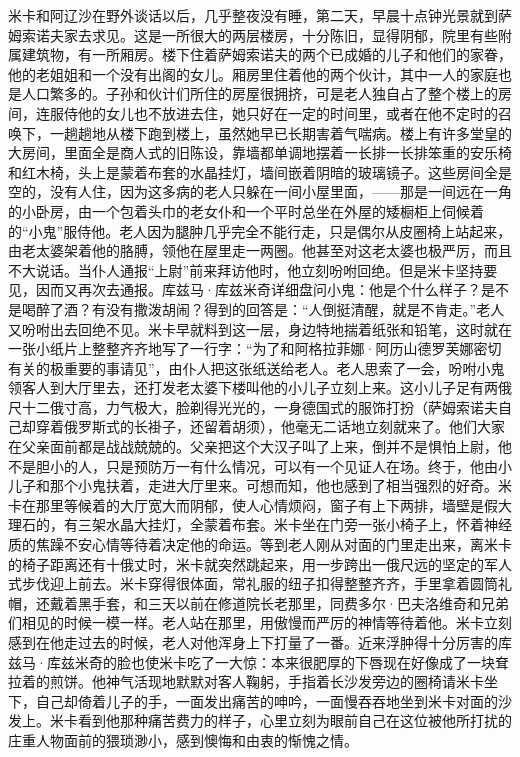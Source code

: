 \par 米卡和阿辽沙在野外谈话以后，几乎整夜没有睡，第二天，早晨十点钟光景就到萨姆索诺夫家去求见。这是一所很大的两层楼房，十分陈旧，显得阴郁，院里有些附属建筑物，有一所厢房。楼下住着萨姆索诺夫的两个已成婚的儿子和他们的家眷，他的老姐姐和一个没有出阁的女儿。厢房里住着他的两个伙计，其中一人的家庭也是人口繁多的。子孙和伙计们所住的房屋很拥挤，可是老人独自占了整个楼上的房间，连服侍他的女儿也不放进去住，她只好在一定的时间里，或者在他不定时的召唤下，一趟趟地从楼下跑到楼上，虽然她早已长期害着气喘病。楼上有许多堂皇的大房间，里面全是商人式的旧陈设，靠墙都单调地摆着一长排一长排笨重的安乐椅和红木椅，头上是蒙着布套的水晶挂灯，墙间嵌着阴暗的玻璃镜子。这些房间全是空的，没有人住，因为这多病的老人只躲在一间小屋里面，——那是一间远在一角的小卧房，由一个包着头巾的老女仆和一个平时总坐在外屋的矮橱柜上伺候着的“小鬼”服侍他。老人因为腿肿几乎完全不能行走，只是偶尔从皮圈椅上站起来，由老太婆架着他的胳膊，领他在屋里走一两圈。他甚至对这老太婆也极严厉，而且不大说话。当仆人通报“上尉”前来拜访他时，他立刻吩咐回绝。但是米卡坚持要见，因而又再次去通报。库兹马·库兹米奇详细盘问小鬼：他是个什么样子？是不是喝醉了酒？有没有撒泼胡闹？得到的回答是：“人倒挺清醒，就是不肯走。”老人又吩咐出去回绝不见。米卡早就料到这一层，身边特地揣着纸张和铅笔，这时就在一张小纸片上整整齐齐地写了一行字：“为了和阿格拉菲娜·阿历山德罗芙娜密切有关的极重要的事请见”，由仆人把这张纸送给老人。老人思索了一会，吩咐小鬼领客人到大厅里去，还打发老太婆下楼叫他的小儿子立刻上来。这小儿子足有两俄尺十二俄寸高，力气极大，脸剃得光光的，一身德国式的服饰打扮（萨姆索诺夫自己却穿着俄罗斯式的长褂子，还留着胡须），他毫无二话地立刻就来了。他们大家在父亲面前都是战战兢兢的。父亲把这个大汉子叫了上来，倒并不是惧怕上尉，他不是胆小的人，只是预防万一有什么情况，可以有一个见证人在场。终于，他由小儿子和那个小鬼扶着，走进大厅里来。可想而知，他也感到了相当强烈的好奇。米卡在那里等候着的大厅宽大而阴郁，使人心情烦闷，窗子有上下两排，墙壁是假大理石的，有三架水晶大挂灯，全蒙着布套。米卡坐在门旁一张小椅子上，怀着神经质的焦躁不安心情等待着决定他的命运。等到老人刚从对面的门里走出来，离米卡的椅子距离还有十俄丈时，米卡就突然跳起来，用一步跨出一俄尺远的坚定的军人式步伐迎上前去。米卡穿得很体面，常礼服的纽子扣得整整齐齐，手里拿着圆筒礼帽，还戴着黑手套，和三天以前在修道院长老那里，同费多尔·巴夫洛维奇和兄弟们相见的时候一模一样。老人站在那里，用傲慢而严厉的神情等待着他。米卡立刻感到在他走过去的时候，老人对他浑身上下打量了一番。近来浮肿得十分厉害的库兹马·库兹米奇的脸也使米卡吃了一大惊：本来很肥厚的下唇现在好像成了一块耷拉着的煎饼。他神气活现地默默对客人鞠躬，手指着长沙发旁边的圈椅请米卡坐下，自己却倚着儿子的手，一面发出痛苦的呻吟，一面慢吞吞地坐到米卡对面的沙发上。米卡看到他那种痛苦费力的样子，心里立刻为眼前自己在这位被他所打扰的庄重人物面前的猥琐渺小，感到懊悔和由衷的惭愧之情。
